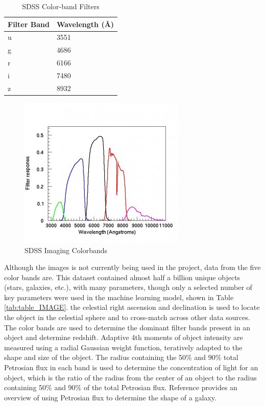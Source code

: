 \documentclass[11pt,sigconf]{acmart}
\begin{document}
\begin{table}[]
  \begin{tabular}{ |p{2.2cm}|p{2.6cm}|  } \hline
   \textbf{Filter Band} & \textbf{Wavelength (\AA)} \\ \hline
   u & 3551 \\ \hline
   g & 4686 \\ \hline
   r & 6166 \\ \hline
   i & 7480 \\ \hline
   z & 8932 \\ \hline
  \end{tabular}
  \caption{\label{tab:table_filters}SDSS Color-band Filters \cite{sdss_imaging}}
\end{table}

\begin{figure}[htbp]
  \centering
  \includegraphics[scale=0.5]{camera_filters-300x274}
  \caption{SDSS Imaging Colorbands \cite{sdss_imaging}}
  \label{fig:colorbands}
\end{figure}

Although the images is not currently being used in the project, data from the five 
color bands are. This dataset contained almost half a billion unique 
objects (stars, galaxies, etc.), with many parameters, though only a selected 
number of key parameters were used in the machine learning model, shown in 
Table \ref{tab:table_IMAGE}. the celestial right ascension and declination is used to 
locate the object in the celestial sphere and to cross-match across other data sources. 
The color bands are used to determine the dominant filter bands present in an object and 
determine redshift. Adaptive 4th moments of object intensity are measured using a radial 
Gaussian weight function, teratively adapted to the shape and size of the object. The 
radius containing the 50\% and 90\% total Petrosian flux in each band is used to 
determine the concentration of light for an object, which is the ratio of the radius 
from the center of an object to the radius containing 50\% and 90\% of the total 
Petrosian flux. Reference \cite{galaxy_photometry} provides an overview of using 
Petrosian flux to determine the shape of a galaxy.
\end{document}
